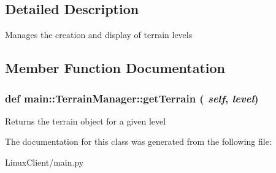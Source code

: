 \subsection{Detailed Description}
\begin{DoxyVerb}
Manages the creation and display of terrain levels
\end{DoxyVerb}
 

\subsection{Member Function Documentation}
\hypertarget{classmain_1_1TerrainManager_a5eb8a934b6eed713b92f1c0fc4ff160d}{
\subsubsection[{getTerrain}]{\setlength{\rightskip}{0pt plus 5cm}def main::TerrainManager::getTerrain ( {\em self}, \/   {\em level})}}
\label{classmain_1_1TerrainManager_a5eb8a934b6eed713b92f1c0fc4ff160d}
\begin{DoxyVerb}
Returns the terrain object for a given level
\end{DoxyVerb}
 

The documentation for this class was generated from the following file:\begin{DoxyCompactItemize}
\item 
LinuxClient/main.py\end{DoxyCompactItemize}
